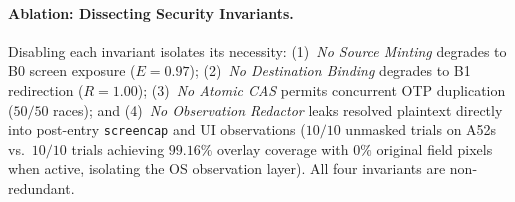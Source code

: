 \paragraph{Ablation: Dissecting Security Invariants.}
Disabling each invariant isolates its necessity: (1)~\emph{No Source Minting} degrades to B0 screen exposure ($E=0.97$); (2)~\emph{No Destination Binding} degrades to B1 redirection ($R=1.00$); (3)~\emph{No Atomic CAS} permits concurrent OTP duplication ($50/50$ races); and (4)~\emph{No Observation Redactor} leaks resolved plaintext directly into post-entry \texttt{screencap} and UI observations ($10/10$ unmasked trials on A52s vs.\ $10/10$ trials achieving $99.16\%$ overlay coverage with $0\%$ original field pixels when active, isolating the OS observation layer). All four invariants are non-redundant.

